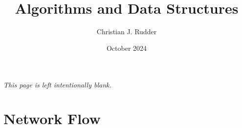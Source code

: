 \documentclass{memoir}
\title{Algorithms and Data Structures}
\author{Christian J. Rudder}
\date{October 2024}
\begin{document}
\maketitle
\setcounter{tocdepth}{2}

\tableofcontents

\newpage
\thispagestyle{empty}
\mbox{}
\vfill
\begin{center}
    \textit{This page is left intentionally blank.}
\end{center}
\vfill
\newpage


% 

% 
% 
% 

% 
% 
% 

% 
% 
% 

% 
% 

% 

% 
% 
% 

% 
% 

\chapter{Network Flow}

\end{document}
